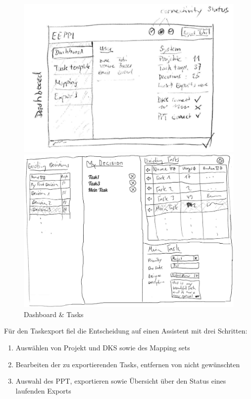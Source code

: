 	\begin{figure}[H]
		\begin{minipage}[b]{0.5\linewidth}
			\includegraphics[width=\linewidth]{interfacesAndProtocols/media/img/dashboard.jpg}
		\end{minipage}
		\begin{minipage}[b]{0.5\linewidth}	
			\includegraphics[width=\linewidth]{interfacesAndProtocols/media/img/tasks.jpg}
		\end{minipage}
		\caption{Dashboard \& Tasks}
		\label{fig:dashboardAndTasks}
	\end{figure}
	
	Für den Taskexport fiel die Entscheidung auf einen Assistent mit drei Schritten:
	\begin{enumerate}
		\item Auswählen von Projekt und DKS sowie des Mapping sets
		\item Bearbeiten der zu exportierenden Tasks, entfernen von nicht gewünschten
		\item Auswahl des PPT, exportieren sowie Übersicht über den Status eines laufenden Exports
	\end{enumerate}
	
